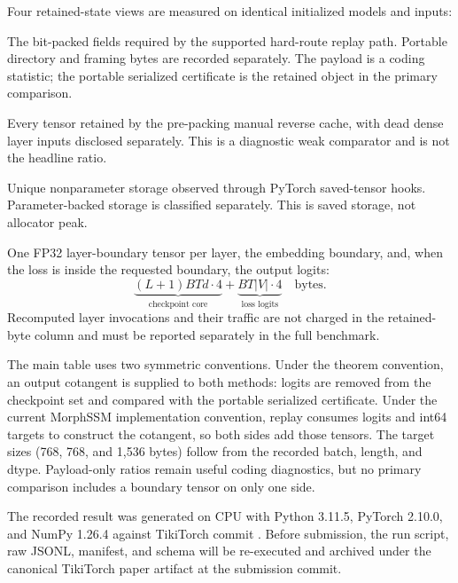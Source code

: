 Four retained-state views are measured on identical initialized models and
inputs:
\begin{description}[leftmargin=1.6em,style=nextline]
  \item[Certificate payload.] The bit-packed fields required by the supported
  hard-route replay path.  Portable directory and framing bytes are recorded
  separately.  The payload is a coding statistic; the portable serialized
  certificate is the retained object in the primary comparison.
  \item[Inherited cache.] Every tensor retained by the pre-packing manual
  reverse cache, with dead dense layer inputs disclosed separately.  This is a
  diagnostic weak comparator and is not the headline ratio.
  \item[Eager autograd.] Unique nonparameter storage observed through PyTorch
  saved-tensor hooks.  Parameter-backed storage is classified separately.
  This is saved storage, not allocator peak.
  \item[Checkpoint retained set.] One FP32 layer-boundary tensor per layer,
  the embedding boundary, and, when the loss is inside the requested boundary,
  the output logits:
  \begin{equation}
    \underbrace{(L+1)BTd\cdot 4}_{\text{checkpoint core}}
    +\underbrace{BT|V|\cdot 4}_{\text{loss logits}}\quad\text{bytes}.
  \end{equation}
  Recomputed layer invocations and their traffic are not charged in the
  retained-byte column and must be reported separately in the full benchmark.
\end{description}

The main table uses two symmetric conventions.  Under the theorem convention,
an output cotangent is supplied to both methods: logits are removed from the
checkpoint set and compared with the portable serialized certificate.  Under
the current MorphSSM implementation convention, replay consumes logits and
int64 targets to construct the cotangent, so both sides add those tensors.  The
target sizes (768, 768, and 1,536 bytes) follow from the recorded batch, length,
and dtype.  Payload-only ratios remain useful coding diagnostics, but no primary
comparison includes a boundary tensor on only one side.

The recorded result was generated on CPU with Python 3.11.5, PyTorch 2.10.0,
and NumPy 1.26.4 against TikiTorch commit
.  Before submission, the run
script, raw JSONL, manifest, and schema will be re-executed and archived under
the canonical TikiTorch paper artifact at the submission commit.

